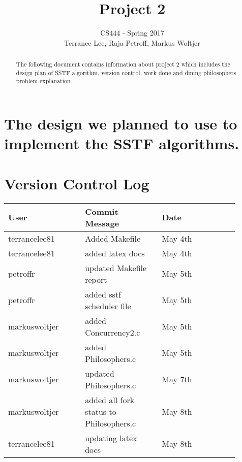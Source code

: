 \documentclass[draftclsnofoot,onecolumn,10pt,compsoc]{IEEEtran}
\begin{document}
\begin{titlepage}
	\title{Project 2}
	\author{CS444 - Spring 2017 \\ Terrance Lee, Raja Petroff, Markus Woltjer}
	\maketitle
	\begin{abstract}
		The following document contains information about project 2 which includes the design plan of SSTF algorithm, version control, work done and dining philosophers problem explanation.  
	\end{abstract}
	
	\thispagestyle{empty} %
	
\end{titlepage}

\tableofcontents

\newpage

\section{The design we planned to use to implement the SSTF algorithms.}
\section{Version Control Log}
\begin{center}
	\begin{tabular}{| p{0.3\linewidth} | p{0.3\linewidth} | p{0.3\linewidth} |}
		\hline User & Commit Message & Date\\
		\hline terrancelee81 & Added Makefile & May 4th\\
		\hline terrancelee81 & added latex docs& May 4th\\
		\hline petroffr & updated Makefile report & May 5th \\	
		\hline petroffr & added sstf scheduler file & May 5th \\ 	
		\hline markuswoltjer & added Concurrency2.c & May 5th\\
		\hline markuswoltjer & added Philosophers.c & May 5th\\	
		\hline markuswoltjer & updated Philosophers.c & May 7th\\	
		\hline markuswoltjer & added all fork status to Philosophers.c & May 8th\\
		\hline terrancelee81 & updating  latex docs & May 8th\\	
	\end{tabular}
\end{center}
\end{document}
